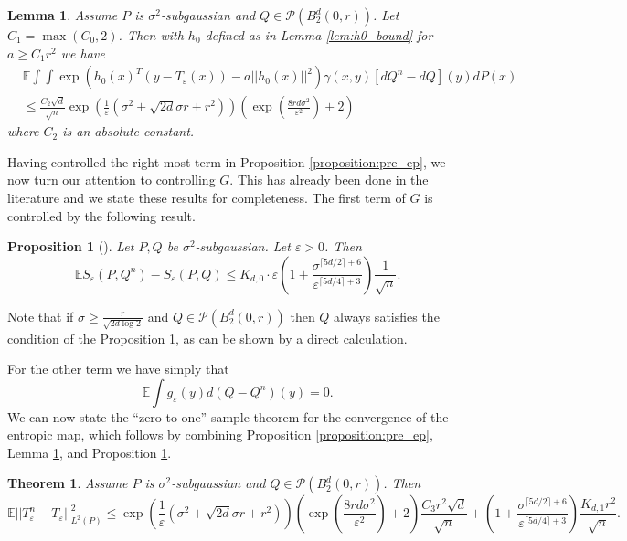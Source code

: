 \documentclass{article}
\newtheorem{lemma}{Lemma}
\newtheorem{proposition}{Proposition}
\newtheorem{theorem}{Theorem}
\theoremstyle{definition}
\newcommand{\geps}{g_\varepsilon}
\newcommand{\Teps}{T_\varepsilon}
\begin{document}
\begin{lemma} \label{lem:int_bound_subg}
    Assume $P$ is $\sigma^2$-subgaussian and $Q \in \mathcal{P}(B_2^d(0,r))$. Let $C_1 = \max(C_0,2)$. Then with $h_0$ defined as in Lemma \ref{lem:h0_bound} for $a \geq C_1r^2$ we have
    \begin{align*}
        &\mathbb{E} \int \int \exp\left (h_0(x)^T(y - \Teps(x)) - a||h_0(x)||^2 \right )\gamma(x,y) [dQ^n - dQ](y)dP(x) \\
        &\leq \frac{C_2\sqrt{d}}{\sqrt{n}} 
        \exp \left (
            \frac{1}{\varepsilon} \left (  
                \sigma^2 + \sqrt{2 d} \sigma r + r^2
            \right ) 
        \right ) 
        \left ( 
            \exp \left (
                \frac{8rd\sigma^2}{\varepsilon^2}
            \right ) 
            + 2 
        \right )
    \end{align*}
    where $C_2$ is an absolute constant.
\end{lemma}

Having controlled the right most term in Proposition \ref{proposition:pre_ep}, we now turn our attention to controlling $G$. This has already been done in the literature and we state these results for completeness. The first term of $G$ is controlled by the following result.
\begin{proposition}[\cite{mena2019statistical}] \label{prop:mena2019} Let $P,Q$ be $\sigma^2$-subgaussian. Let $\varepsilon > 0$. Then
\begin{equation*}
    \mathbb{E}S_\varepsilon(P,Q^n) - S_\varepsilon(P,Q) \leq K_{d,0} \cdot \varepsilon \left ( 1 + \frac{\sigma^{\lceil 5d / 2 \rceil + 6}}{\varepsilon^{\lceil 5d/4 \rceil + 3}} \right )\frac{1}{\sqrt{n}}.
\end{equation*}
\end{proposition}
Note that if $\sigma \geq \frac{r}{\sqrt{2d \log 2}}$ and $Q \in \mathcal{P}(B_2^d(0,r))$ then $Q$ always satisfies the condition of the Proposition \ref{prop:mena2019}, as can be shown by a direct calculation. 

For the other term we have simply that
\begin{equation*}
    \mathbb{E}\int \geps(y) d(Q-Q^n)(y) = 0.
\end{equation*}
We can now state the ``zero-to-one'' sample theorem for the convergence of the entropic map, which follows by combining Proposition \ref{proposition:pre_ep}, Lemma \ref{lem:int_bound_subg}, and Proposition \ref{prop:mena2019}.

\begin{theorem} \label{thm:0_to_1_subg}
      Assume $P$ is $\sigma^2$-subgaussian and $Q \in \mathcal{P}(B_2^d(0,r))$. Then
     \begin{equation*}
         \mathbb{E}||\Teps^n - \Teps||_{L^2(P)}^2 \leq 
         \exp \left (
            \frac{1}{\varepsilon} 
            \left (  \sigma^2 + \sqrt{2 d} \sigma r + r^2 \right ) \right ) \left ( \exp \left ( \frac{8rd\sigma^2}{\varepsilon^2}\right ) + 2 \right )\frac{C_3r^2\sqrt{d}}{\sqrt{n}} +  \left ( 1 + \frac{\sigma^{\lceil 5d / 2 \rceil + 6}}{\varepsilon^{\lceil 5d/4 \rceil + 3}} \right )\frac{K_{d,1}r^2}{\sqrt{n}}.
     \end{equation*}
\end{theorem}
\end{document}
